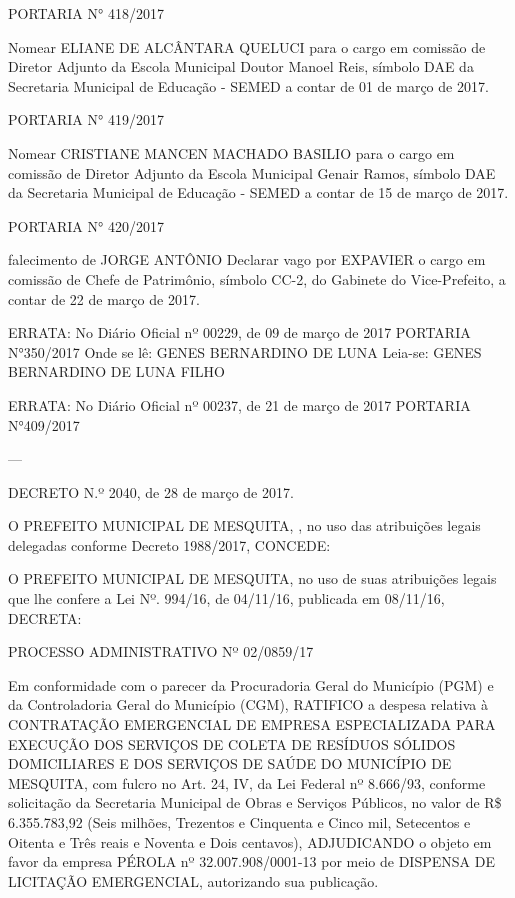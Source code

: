 \documentclass{doliberto}
\begin{document}
PORTARIA N° 418/2017 

Nomear  ELIANE  DE  ALCÂNTARA  QUELUCI  para  o  cargo 
em  comissão  de  Diretor  Adjunto  da  Escola  Municipal 
Doutor  Manoel  Reis,  símbolo  DAE  da  Secretaria 
Municipal de Educação - SEMED a contar de 01 de março 
de 2017. 

PORTARIA N° 419/2017 

Nomear  CRISTIANE  MANCEN  MACHADO  BASILIO  para  o 
cargo  em  comissão  de  Diretor  Adjunto  da  Escola 
Municipal  Genair  Ramos,  símbolo  DAE  da  Secretaria 
Municipal de Educação - SEMED a contar de 15 de março 
de 2017. 

PORTARIA N° 420/2017 

falecimento  de  JORGE  ANTÔNIO 
Declarar  vago  por 
EXPAVIER o cargo em comissão de Chefe de Patrimônio, 
símbolo  CC-2,  do  Gabinete  do  Vice-Prefeito,  a  contar  de 
22 de março de 2017. 

ERRATA: 
No Diário Oficial nº 00229, de 09 de março de 2017 
PORTARIA N°350/2017 
Onde se lê: 
GENES BERNARDINO DE LUNA 
Leia-se: 
GENES BERNARDINO DE LUNA FILHO 
 
ERRATA: 
No Diário Oficial nº 00237, de 21 de março de 2017 
PORTARIA N°409/2017 

---

DECRETO N.º 2040, de 28 de março de 2017. 

O  PREFEITO  MUNICIPAL  DE  MESQUITA,  ,  no  uso  das 
atribuições legais delegadas conforme Decreto 1988/2017, 
CONCEDE:  

O  PREFEITO  MUNICIPAL  DE  MESQUITA,  no  uso  de  suas 
atribuições  legais  que  lhe  confere  a  Lei  Nº.  994/16,  de 
04/11/16, publicada em 08/11/16, DECRETA: 

PROCESSO ADMINISTRATIVO Nº 02/0859/17 

Em conformidade com o parecer da Procuradoria Geral do 
Município  (PGM)  e  da  Controladoria  Geral  do  Município 
(CGM),  RATIFICO  a  despesa  relativa  à  CONTRATAÇÃO 
EMERGENCIAL  DE  EMPRESA  ESPECIALIZADA  PARA 
EXECUÇÃO  DOS  SERVIÇOS  DE  COLETA  DE  RESÍDUOS 
SÓLIDOS  DOMICILIARES  E  DOS  SERVIÇOS  DE  SAÚDE  DO 
MUNICÍPIO DE MESQUITA, com fulcro no Art. 24, IV, da Lei 
Federal  nº  8.666/93,  conforme  solicitação  da  Secretaria 
Municipal  de  Obras  e  Serviços  Públicos,  no  valor  de  R\$ 
6.355.783,92 (Seis milhões, Trezentos e Cinquenta e Cinco 
mil,  Setecentos  e  Oitenta  e  Três  reais  e  Noventa  e  Dois 
centavos),  ADJUDICANDO  o  objeto  em  favor  da  empresa 
PÉROLA 
nº 
32.007.908/0001-13 por meio de DISPENSA DE LICITAÇÃO 
EMERGENCIAL, autorizando sua publicação. 
\end{document}
